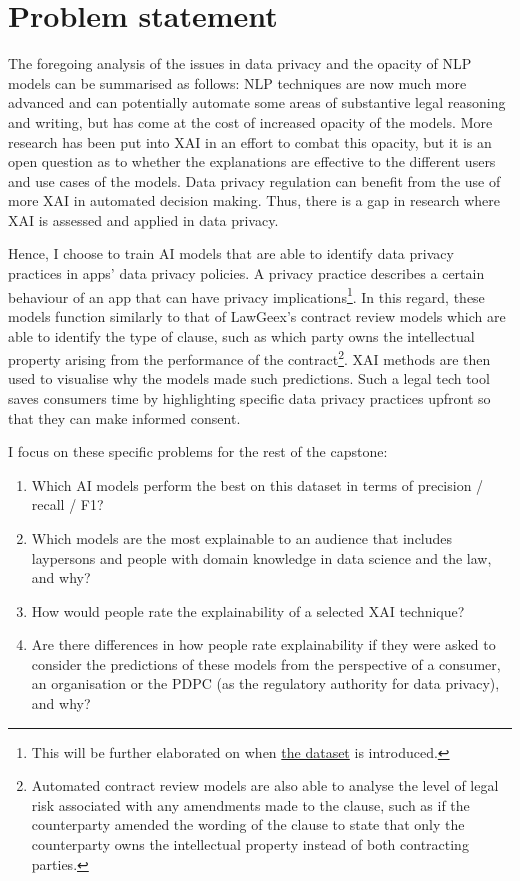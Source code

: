 \section{Problem statement}
The foregoing analysis of the issues in data privacy and the opacity of NLP models can be summarised as follows: NLP techniques are now much more advanced and can potentially automate some areas of substantive legal reasoning and writing, but has come at the cost of increased opacity of the models. More research has been put into XAI in an effort to combat this opacity, but it is an open question as to whether the explanations are effective to the different users and use cases of the models. Data privacy regulation can benefit from the use of more XAI in automated decision making. Thus, there is a gap in research where XAI is assessed and applied in data privacy. 

Hence, I choose to train AI models that are able to identify data privacy practices in apps' data privacy policies. A privacy practice describes a certain behaviour of an app that can have privacy implications\footnote{This will be further elaborated on when \hyperref[app350_corpus]{the dataset} is introduced.}. In this regard, these models function similarly to that of LawGeex's contract review models which are able to identify the type of clause, such as which party owns the intellectual property arising from the performance of the contract\footnote{Automated contract review models are also able to analyse the level of legal risk associated with any amendments made to the clause, such as if the counterparty amended the wording of the clause to state that only the counterparty owns the intellectual property instead of both contracting parties.}. XAI methods are then used to visualise why the models made such predictions. Such a legal tech tool saves consumers time by highlighting specific data privacy practices upfront so that they can make informed consent. 

I focus on these specific problems for the rest of the capstone:

\begin{enumerate}
  \item Which AI models perform the best on this dataset in terms of precision / recall / F1?
  \item Which models are the most explainable to an audience that includes laypersons and people with domain knowledge in data science and the law, and why?
  \item How would people rate the explainability of a selected XAI technique?
  \item Are there differences in how people rate explainability if they were asked to consider the predictions of these models from the perspective of a consumer, an organisation or the PDPC (as the regulatory authority for data privacy), and why?
\end{enumerate}

